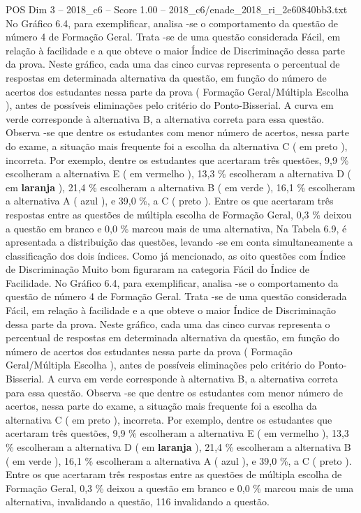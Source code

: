 \begin{textsample}{POS Dim 3 – 2018\_c6 – Score 1.00 – 2018\_c6/enade\_2018\_ri\_2e60840bb3.txt}
No Gráfico 6.4, para exemplificar, analisa -se o comportamento da questão de número 4 de Formação Geral.
Trata -se de uma questão considerada Fácil, em relação à facilidade e a que obteve o maior Índice de Discriminação dessa parte da prova.
Neste gráfico, cada uma das cinco curvas representa o percentual de respostas em determinada alternativa da questão, em função do número de acertos dos estudantes nessa parte da prova ( Formação Geral/Múltipla Escolha ), antes de possíveis eliminações pelo critério do Ponto-Bisserial.
A curva em verde corresponde à alternativa B, a alternativa correta para essa questão.
Observa -se que dentre os estudantes com menor número de acertos, nessa parte do exame, a situação mais frequente foi a escolha da alternativa C ( em preto ), incorreta.
Por exemplo, dentre os estudantes que acertaram três questões, 9,9 \% escolheram a alternativa E ( em vermelho ), 13,3 \% escolheram a alternativa D ( em \textbf{laranja} ), 21,4 \% escolheram a alternativa B ( em verde ), 16,1 \% escolheram a alternativa A ( azul ), e 39,0 \%, a C ( preto ).
Entre os que acertaram três respostas entre as questões de múltipla escolha de Formação Geral, 0,3 \% deixou a questão em branco e 0,0 \% marcou mais de uma alternativa, Na Tabela 6.9, é apresentada a distribuição das questões, levando -se em conta simultaneamente a classificação dos dois índices.
Como já mencionado, as oito questões com Índice de Discriminação Muito bom figuraram na categoria Fácil do Índice de Facilidade.
No Gráfico 6.4, para exemplificar, analisa -se o comportamento da questão de número 4 de Formação Geral.
Trata -se de uma questão considerada Fácil, em relação à facilidade e a que obteve o maior Índice de Discriminação dessa parte da prova.
Neste gráfico, cada uma das cinco curvas representa o percentual de respostas em determinada alternativa da questão, em função do número de acertos dos estudantes nessa parte da prova ( Formação Geral/Múltipla Escolha ), antes de possíveis eliminações pelo critério do Ponto-Bisserial.
A curva em verde corresponde à alternativa B, a alternativa correta para essa questão.
Observa -se que dentre os estudantes com menor número de acertos, nessa parte do exame, a situação mais frequente foi a escolha da alternativa C ( em preto ), incorreta.
Por exemplo, dentre os estudantes que acertaram três questões, 9,9 \% escolheram a alternativa E ( em vermelho ), 13,3 \% escolheram a alternativa D ( em \textbf{laranja} ), 21,4 \% escolheram a alternativa B ( em verde ), 16,1 \% escolheram a alternativa A ( azul ), e 39,0 \%, a C ( preto ).
Entre os que acertaram três respostas entre as questões de múltipla escolha de Formação Geral, 0,3 \% deixou a questão em branco e 0,0 \% marcou mais de uma alternativa, invalidando a questão, 116 invalidando a questão.

\end{textsample}
